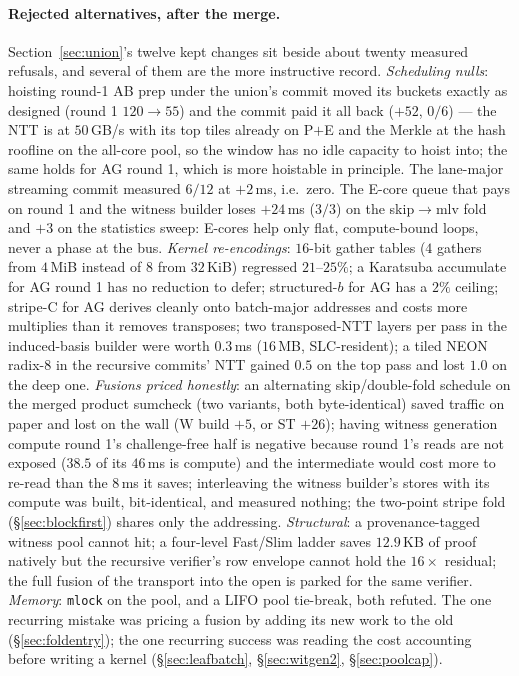 \documentclass[11pt]{article}
\newcommand{\code}[1]{\texttt{#1}}
\begin{document}
\paragraph{Rejected alternatives, after the merge.}
Section~\ref{sec:union}'s twelve kept changes sit beside about twenty
measured refusals, and several of them are the more instructive
record. \emph{Scheduling nulls}: hoisting round-1 AB prep under the
union's commit moved its buckets exactly as designed (round 1
$120\to55$) and the commit paid it all back ($+52$, $0/6$) --- the NTT
is at $50\,$GB/s with its top tiles already on P$+$E and the Merkle at
the hash roofline on the all-core pool, so the window has no idle
capacity to hoist into; the same holds for AG round 1, which is more
hoistable in principle. The lane-major streaming commit measured
$6/12$ at $+2\,$ms, i.e.\ zero. The E-core queue that pays on round 1
and the witness builder loses $+24\,$ms ($3/3$) on the skip$\to$mlv
fold and $+3$ on the statistics sweep: E-cores help only flat,
compute-bound loops, never a phase at the bus. \emph{Kernel re-encodings}:
$16$-bit gather tables ($4$ gathers from $4\,$MiB instead of $8$ from
$32\,$KiB) regressed $21$--$25\%$; a Karatsuba accumulate for AG round 1
has no reduction to defer; structured-$b$ for AG has a $2\%$ ceiling;
stripe-C for AG derives cleanly onto batch-major addresses and costs
more multiplies than it removes transposes; two transposed-NTT layers
per pass in the induced-basis builder were worth $0.3\,$ms
($16\,$MB, SLC-resident); a tiled NEON radix-8 in the recursive
commits' NTT gained $0.5$ on the top pass and lost $1.0$ on the deep
one. \emph{Fusions priced honestly}: an alternating skip/double-fold
schedule on the merged product sumcheck (two variants, both
byte-identical) saved traffic on paper and lost on the wall
($\mathrm{W}$ build $+5$, or ST $+26$); having witness generation
compute round 1's challenge-free half is negative because round 1's
reads are not exposed ($38.5$ of its $46\,$ms is compute) and the
intermediate would cost more to re-read than the $8\,$ms it saves;
interleaving the witness builder's stores with its compute was built,
bit-identical, and measured nothing; the two-point stripe fold
(\S\ref{sec:blockfirst}) shares only the addressing. \emph{Structural}: a
provenance-tagged witness pool cannot hit; a four-level Fast/Slim
ladder saves $12.9\,$KB of proof natively but the recursive verifier's
row envelope cannot hold the $16\times$ residual; the full fusion of the
transport into the open is parked for the same verifier. \emph{Memory}:
\code{mlock} on the pool, and a LIFO pool tie-break, both refuted. The
one recurring mistake was pricing a fusion by adding its new work to
the old (\S\ref{sec:foldentry}); the one recurring success was reading
the cost accounting before writing a kernel (\S\ref{sec:leafbatch},
\S\ref{sec:witgen2}, \S\ref{sec:poolcap}).
\end{document}
